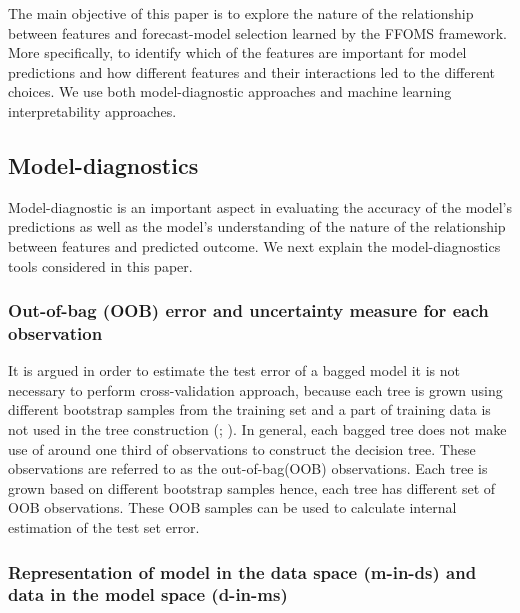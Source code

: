 \documentclass[11pt,a4paper,]{article}
\begin{document}
The main objective of this paper is to explore the nature of the
relationship between features and forecast-model selection learned by
the FFOMS framework. More specifically, to identify which of the
features are important for model predictions and how different features
and their interactions led to the different choices. We use both
model-diagnostic approaches and machine learning interpretability
approaches.

\subsection{Model-diagnostics}\label{model-diagnostics}

Model-diagnostic is an important aspect in evaluating the accuracy of
the model's predictions as well as the model's understanding of the
nature of the relationship between features and predicted outcome. We
next explain the model-diagnostics tools considered in this paper.

\subsubsection{Out-of-bag (OOB) error and uncertainty measure for each
observation}\label{out-of-bag-oob-error-and-uncertainty-measure-for-each-observation}

It is argued in order to estimate the test error of a bagged model it is
not necessary to perform cross-validation approach, because each tree is
grown using different bootstrap samples from the training set and a part
of training data is not used in the tree construction
(\textcite{breiman2001random}; \textcite{chen2004using}). In general,
each bagged tree does not make use of around one third of observations
to construct the decision tree. These observations are referred to as
the out-of-bag(OOB) observations. Each tree is grown based on different
bootstrap samples hence, each tree has different set of OOB
observations. These OOB samples can be used to calculate internal
estimation of the test set error.

\subsubsection{Representation of model in the data space (m-in-ds) and
data in the model space
(d-in-ms)}\label{representation-of-model-in-the-data-space-m-in-ds-and-data-in-the-model-space-d-in-ms}
\end{document}
